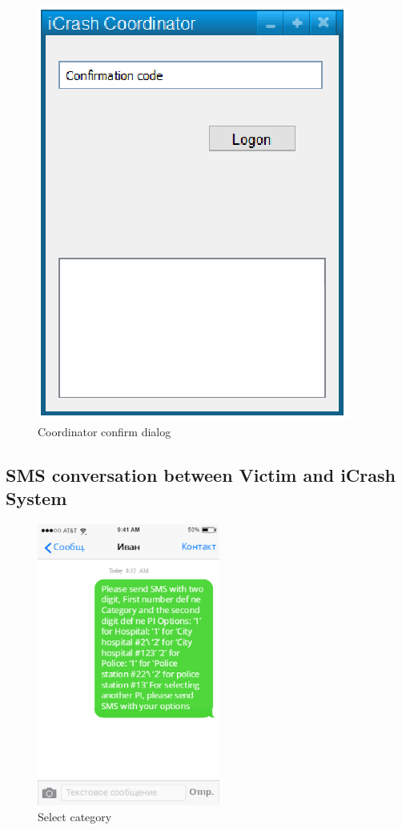 \begin{figure}
  \centering
    \includegraphics{images/mockups/feature1-login/CoordinatorConfirm.eps}
  \caption{Coordinator confirm dialog}
  \label{fig:CoordinatorConfirm}
\end{figure}
\subsection{SMS conversation between Victim and iCrash System}

\begin{figure}
  \centering
    \includegraphics[width=6cm]{images/mockups/feature3-PI/1.eps}
  \caption{Select category}
  \label{fig:Selectcategory}
\end{figure}


